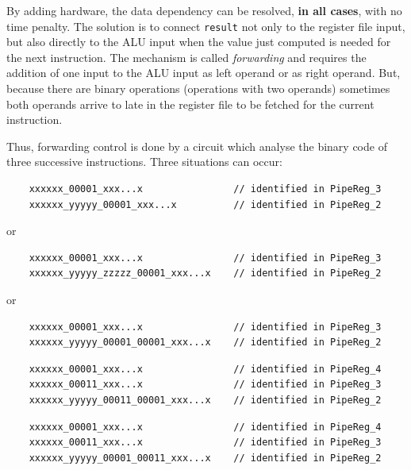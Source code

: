 By adding hardware, the data dependency can be resolved, {\bf in all cases}, with no time penalty. The solution is to connect {\tt result} not only to the register file input, but also directly to the ALU input when the value just computed is needed for the next instruction. The mechanism is called {\em forwarding} and requires the addition of one input to the  ALU input as left operand or as right operand. But, because there are binary operations (operations with two operands) sometimes both operands arrive to late in the register file to be fetched for the current instruction.

Thus, forwarding control is done by a circuit which analyse the binary code of three successive instructions. Three situations can occur:
\begin{verbatim}
    xxxxxx_00001_xxx...x                // identified in PipeReg_3
    xxxxxx_yyyyy_00001_xxx...x          // identified in PipeReg_2
\end{verbatim}
or
\begin{verbatim}
    xxxxxx_00001_xxx...x                // identified in PipeReg_3
    xxxxxx_yyyyy_zzzzz_00001_xxx...x    // identified in PipeReg_2
\end{verbatim}
or
\begin{verbatim}
    xxxxxx_00001_xxx...x                // identified in PipeReg_3
    xxxxxx_yyyyy_00001_00001_xxx...x    // identified in PipeReg_2
\end{verbatim}

\begin{verbatim}
    xxxxxx_00001_xxx...x                // identified in PipeReg_4
    xxxxxx_00011_xxx...x                // identified in PipeReg_3
    xxxxxx_yyyyy_00011_00001_xxx...x    // identified in PipeReg_2
\end{verbatim}

\begin{verbatim}
    xxxxxx_00001_xxx...x                // identified in PipeReg_4
    xxxxxx_00011_xxx...x                // identified in PipeReg_3
    xxxxxx_yyyyy_00001_00011_xxx...x    // identified in PipeReg_2
\end{verbatim}





